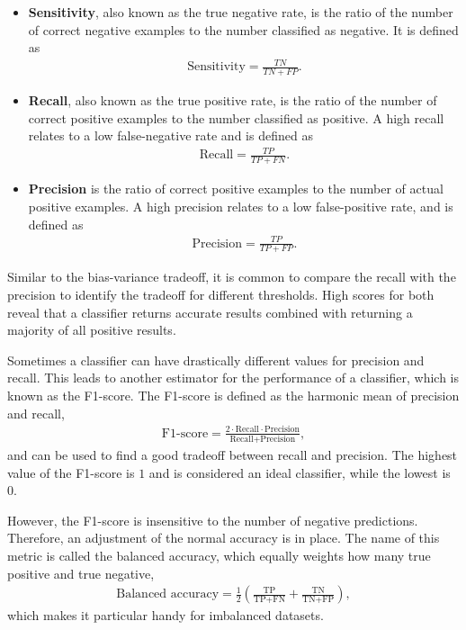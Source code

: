 \begin{itemize}
\item \textbf{Sensitivity}, also known as the true negative rate, is the ratio of the number of correct negative examples to the number classified as negative. It is defined as
\begin{align}
\text{Sensitivity} = \frac{TN}{TN + FP}.
\end{align}

\item \textbf{Recall}, also known as the true positive rate, is the ratio of the number of correct positive examples to the number classified as positive. A high recall relates to a low false-negative rate and is defined as
\begin{align}
\text{Recall} = \frac{TP}{TP + FN}.
\end{align}

\item \textbf{Precision} is the ratio of correct positive examples to the number of actual positive examples. A high precision relates to a low false-positive rate, and is defined as  \\
\begin{align}
\text{Precision} = \frac{TP}{TP + FP}.
\end{align}
\end{itemize} Similar to the bias-variance tradeoff, it is common to compare the recall with the precision to identify the tradeoff for different thresholds. High scores for both reveal that a classifier returns accurate results combined with returning a majority of all positive results.


Sometimes a classifier can have drastically different values for precision and recall. This leads to another estimator for the performance of a classifier, which is known as the F1-score. The F1-score is defined as the harmonic mean of precision and recall,
\begin{align*}
\text{F1-score} = \frac{2\cdot \text{Recall} \cdot \text{Precision}}{\text{Recall} + \text{Precision}},
\end{align*}
and can be used to find a good tradeoff between recall and precision. The highest value of the F1-score is $1$ and is considered an ideal classifier, while the lowest is $0$.

However, the F1-score is insensitive to the number of negative predictions. Therefore, an adjustment of the normal accuracy is in place. The name of this metric is called the balanced accuracy, which equally weights how many true positive and true negative,
\begin{align*}
  \text{Balanced accuracy} = \frac{1}{2} \left( \frac{\text{TP}}{\text{TP} + \text{FN}} + \frac{\text{TN}}{\text{TN} + \text{FP}} \right),
\end{align*}
which makes it particular handy for imbalanced datasets.

